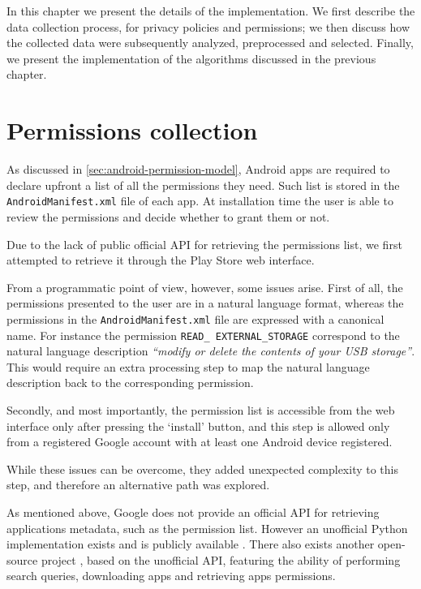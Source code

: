 In this chapter we present the details of the implementation. We first describe the data collection process, for privacy policies and permissions; we then discuss how the collected data were subsequently analyzed, preprocessed and selected. Finally, we present the implementation of the algorithms discussed in the previous chapter.

\section{Permissions collection}
\label{sec:permissions-collection}
As discussed in \autoref{sec:android-permission-model}, Android apps are required to declare upfront a list of all the permissions they need. Such list is stored in the \texttt{AndroidManifest.xml} file of each app. At installation time the user is able to review the permissions and decide whether to grant them or not.

Due to the lack of public official API for retrieving the permissions list, we first attempted to retrieve it through the Play Store web interface.

From a programmatic point of view, however, some issues arise. First of all, the permissions presented to the user are in a natural language format, whereas the permissions in the \texttt{AndroidManifest.xml} file are expressed with a canonical name. For instance the permission \texttt{READ\_ EXTERNAL\_STORAGE} correspond to the natural language description \emph{``modify or delete the contents of your USB storage''}.
This would require an extra processing step to map the natural language description back to the corresponding permission.

Secondly, and most importantly, the permission list is accessible from the web interface only after pressing the `install' button, and this step is allowed only from a registered Google account with at least one Android device registered.

While these issues can be overcome, they added unexpected complexity to this step, and therefore an alternative path was explored.

As mentioned above, Google does not provide an official API for retrieving applications metadata, such as the permission list. However an unofficial Python implementation exists and is publicly available \cite{play-store-unofficial-api}. There also exists another open-source project \cite{play-store-crawler}, based on the unofficial API, featuring the ability of performing search queries, downloading apps and retrieving apps permissions.

